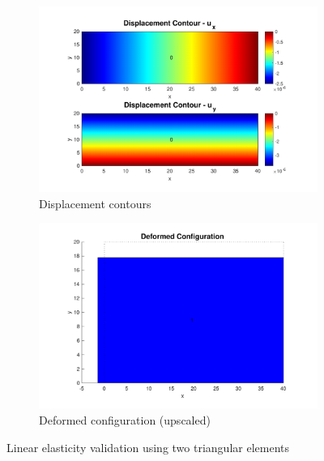 \begin{figure}[!ht]
\centering
\begin{subfigure}{0.45\textwidth}
    \centering
    \includegraphics[width=\textwidth]{midterm/midterm_p1_contour.pdf}
    \caption{Displacement contours}
\end{subfigure}
\begin{subfigure}{0.45\textwidth}
    \centering
    \includegraphics[width=\textwidth]{midterm/midterm_p1_deform.pdf}
    \caption{Deformed configuration (upscaled)}
\end{subfigure}
\caption{Linear elasticity validation using two triangular elements}
\label{fig:midterm_p1}
\end{figure}

